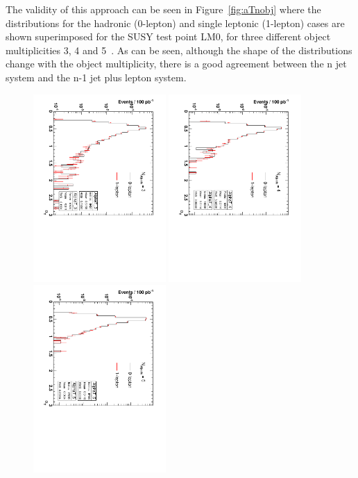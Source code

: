 The validity of this approach can be seen in Figure~\ref{fig:aTnobj} where the \alt distributions for the hadronic (0-lepton) and single leptonic (1-lepton) cases are shown superimposed for the SUSY test point LM0, for three different object multiplicities 3, 4 and 5~\cite{an2009_188}. As can be seen, although the shape of the \alt distributions change with the object multiplicity, there is a good agreement between the n jet system and the n-1 jet plus lepton system. 

\begin{figure}
\centering
\includegraphics[width=0.45\textwidth, angle=90]{Figures/AlphaT/aT_3}
\includegraphics[width=0.45\textwidth,angle=90]{Figures/AlphaT/aT_4}
\includegraphics[width=0.45\textwidth,angle=90]{Figures/AlphaT/aT_5}

\end{figure}
